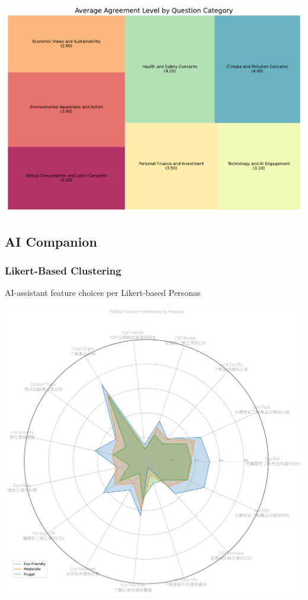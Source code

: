\documentclass[
  letterpaper,
  DIV=11,
  numbers=noendperiod]{scrartcl}
\begin{document}
\includegraphics{_thesis_files/figure-pdf/cell-84-output-1.pdf}

\newpage

\subsection{AI Companion}\label{ai-companion}

\subsubsection{Likert-Based Clustering}\label{likert-based-clustering}

AI-assistant feature choices per Likert-based Personas

\includegraphics{_thesis_files/figure-pdf/cell-86-output-1.pdf}
\end{document}
